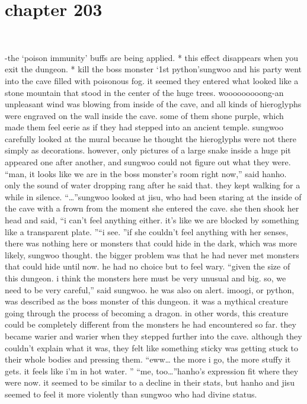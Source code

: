 \section{chapter 203}

                             




-the ‘poison immunity’ buffs are being applied.
* this effect disappears when you exit the dungeon.
* kill the boss monster ‘1st python’sungwoo and his party went into the cave filled with poisonous fog.
 it seemed they entered what looked like a stone mountain that stood in the center of the huge trees.
wooooooooong-an unpleasant wind was blowing from inside of the cave, and all kinds of hieroglyphs were engraved on the wall inside the cave.
 some of them shone purple, which made them feel eerie as if they had stepped into an ancient temple.
sungwoo carefully looked at the mural because he thought the hieroglyphs were not there simply as decorations.
however, only pictures of a large snake inside a huge pit appeared one after another, and sungwoo could not figure out what they were.
“man, it looks like we are in the boss monster’s room right now,” said hanho.
only the sound of water dropping rang after he said that.
they kept walking for a while in silence.
“…”sungwoo looked at jisu, who had been staring at the inside of the cave with a frown from the moment she entered the cave.
she then shook her head and said, “i can’t feel anything either.
 it’s like we are blocked by something like a transparent plate.
”“i see.
”if she couldn’t feel anything with her senses, there was nothing here or monsters that could hide in the dark, which was more likely, sungwoo thought.
the bigger problem was that he had never met monsters that could hide until now.
he had no choice but to feel wary.
“given the size of this dungeon.
 i think the monsters here must be very unusual and big.
 so, we need to be very careful,” said sungwoo.
 he was also on alert.
imoogi, or python, was described as the boss monster of this dungeon.
 it was a mythical creature going through the process of becoming a dragon.
in other words, this creature could be completely different from the monsters he had encountered so far.
they became warier and warier when they stepped further into the cave.
 although they couldn’t explain what it was, they felt like something sticky was getting stuck to their whole bodies and pressing them.
“eww… the more i go, the more stuffy it gets.
 it feels like i’m in hot water.
”
“me, too…”hanho’s expression fit where they were now.
 it seemed to be similar to a decline in their stats, but hanho and jisu seemed to feel it more violently than sungwoo who had divine status.
